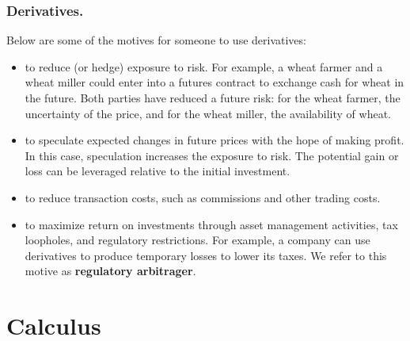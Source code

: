 \documentclass{book}
\begin{document}
\subsection{Derivatives.}
Below are some of the motives for someone to use derivatives:
\begin{itemize}
\item to reduce (or hedge) exposure to risk. For example, a wheat farmer and a wheat miller could
enter into a futures contract to exchange cash for wheat in the future. Both parties have reduced
a future risk: for the wheat farmer, the uncertainty of the price, and for the wheat miller, the
availability of wheat.
\item to speculate expected changes in future prices with the hope of making profit. In this case,
speculation increases the exposure to risk. The potential gain or loss can be leveraged relative to the initial investment.
\item to reduce transaction costs, such as commissions and other trading costs.
\item to maximize return on investments through asset management activities, tax loopholes, and
regulatory restrictions. For example, a company can use derivatives to produce temporary losses to
lower its taxes. We refer to this motive as \textbf{regulatory arbitrager}.
\end{itemize}
\chapter{Calculus}
\end{document}
